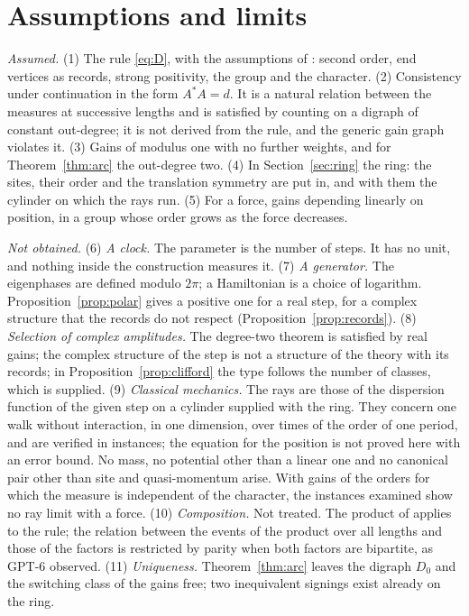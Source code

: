 \section{Assumptions and limits}\label{sec:limits}

\emph{Assumed.} (1) The rule \eqref{eq:D}, with the assumptions of \cite{g8}: second order, end vertices as records, strong positivity, the group and the character. (2) Consistency under continuation in the form $A^*A=d$. It is a natural relation between the measures at successive lengths and is satisfied by counting on a digraph of constant out-degree; it is not derived from the rule, and the generic gain graph violates it. (3) Gains of modulus one with no further weights, and for Theorem~\ref{thm:arc} the out-degree two. (4) In Section~\ref{sec:ring} the ring: the sites, their order and the translation symmetry are put in, and with them the cylinder on which the rays run. (5) For a force, gains depending linearly on position, in a group whose order grows as the force decreases.

\emph{Not obtained.} (6) \emph{A clock.} The parameter is the number of steps. It has no unit, and nothing inside the construction measures it. (7) \emph{A generator.} The eigenphases are defined modulo $2\pi$; a Hamiltonian is a choice of logarithm. Proposition~\ref{prop:polar} gives a positive one for a real step, for a complex structure that the records do not respect (Proposition~\ref{prop:records}). (8) \emph{Selection of complex amplitudes.} The degree-two theorem is satisfied by real gains; the complex structure of the step is not a structure of the theory with its records; in Proposition~\ref{prop:clifford} the type follows the number of classes, which is supplied. (9) \emph{Classical mechanics.} The rays are those of the dispersion function of the given step on a cylinder supplied with the ring. They concern one walk without interaction, in one dimension, over times of the order of one period, and are verified in instances; the equation for the position is not proved here with an error bound. No mass, no potential other than a linear one and no canonical pair other than site and quasi-momentum arise. With gains of the orders for which the measure is independent of the character, the instances examined show no ray limit with a force. (10) \emph{Composition.} Not treated. The product of \cite{g8} applies to the rule; the relation between the events of the product over all lengths and those of the factors is restricted by parity when both factors are bipartite, as GPT-6 observed. (11) \emph{Uniqueness.} Theorem~\ref{thm:arc} leaves the digraph $D_0$ and the switching class of the gains free; two inequivalent signings exist already on the ring.

